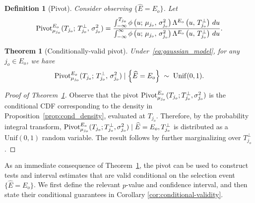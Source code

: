 \documentclass[12pt]{article}
\newcommand{\Pivot}{\text{\normalfont Pivot}}
\newcommand{\nbracket}[1]{\left( #1 \right)}
\newcommand{\cbracket}[1]{\left\{ #1 \right\}}
\newtheorem{theorem}{Theorem}[section]
\newtheorem{definition}{Definition}[section]
\newcommand{\Ehat}{\widehat{E}}
\begin{document}
\begin{definition}[Pivot]
\label{def:pivot}
Consider observing $\{\widehat{E}=E_o\}$. Let
\begin{align}
  \label{eq:pivot}
  \Pivot^{E_o}_{\mu_{j_o}}(T_{j_o};\, T_{j_o}^\perp,\, \sigma_{j_o}^2)
  =
  \dfrac{
    \int_{-\infty}^{T_{j_o}}
    \phi\nbracket{u;\, \mu_{j_o},\, \sigma_{j_o}^2}
    \Lambda^{E_o}\nbracket{u,\, T_{j_o}^\perp}
    \, du
  }{
    \int_{-\infty}^{\infty}
    \phi\nbracket{u;\, \mu_{j_o},\, \sigma_{j_o}^2}
    \Lambda^{E_o}\nbracket{u,\, T_{j_o}^\perp}
    \, du
  }.
\end{align}
\end{definition}


\begin{theorem}[Conditionally-valid pivot]
\label{thm:pivot}
Under~\eqref{eq:gaussian_model}, for any $j_o \in E_o$, we have
\begin{equation*}
  \label{eq:pivot_unif}
  \Pivot^{E_o}_{\mu_{j_o}}(T_{j_o};\, T_{j_o}^\perp,\, \sigma_{j_o}^2)
  \mid \cbracket{\Ehat = E_o}
  \;\sim\;
  \mathrm{Unif}(0,1).
\end{equation*}
\end{theorem}

\begin{proof}[Proof of Theorem~\ref{thm:pivot}]
Observe that the pivot $\Pivot^{E_o}_{\mu_{j_o}}(T_{j_o}; T_{j_o}^\perp,\sigma_{j_o}^2)$ is the conditional CDF corresponding to the density in Proposition~\ref{prop:cond_density}, evaluated at $T_{j_o}$. 
Therefore, by the probability integral transform,
$\Pivot^{E_o}_{\mu_{j_o}}(T_{j_o};T_{j_o}^\perp,\sigma_{j_o}^2)\mid {\widehat{E}=E_o,T_{j_o}^\perp}$
is distributed as a $\mathrm{Unif}(0,1)$ random variable. 
The result follows by further marginalizing over $T_{j_o}^\perp$.
\end{proof}


As an immediate consequence of Theorem~\ref{thm:pivot}, the pivot can be used to construct tests and interval estimates that are valid conditional on the selection event $\{\Ehat = E_o\}$. 
We first define the relevant $p$-value and confidence interval, and then state their conditional guarantees in Corollary \ref{cor:conditional-validity}.
\end{document}
